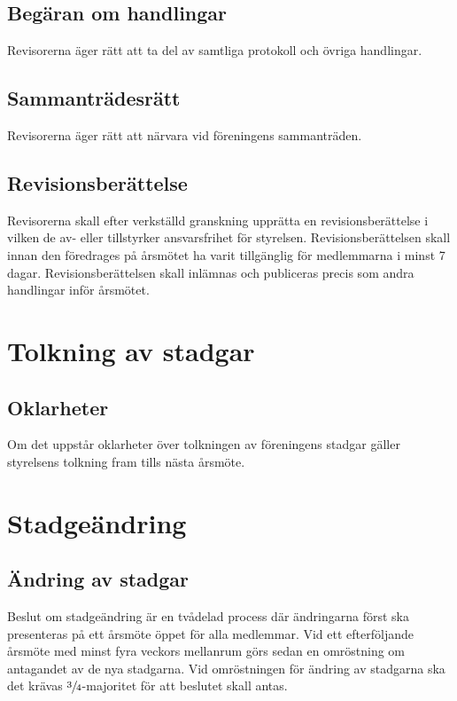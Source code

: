 \documentclass[11pt,a4paper]{article}
\begin{document}
\subsection{Begäran om handlingar}
Revisorerna äger rätt att ta del av samtliga protokoll och övriga handlingar.
\subsection{Sammanträdesrätt}
Revisorerna äger rätt att närvara vid föreningens sammanträden.
\subsection{Revisionsberättelse}
Revisorerna skall efter verkställd granskning upprätta en revisionsberättelse i vilken de av- eller tillstyrker ansvarsfrihet för styrelsen. Revisionsberättelsen skall innan den föredrages på årsmötet ha varit tillgänglig för medlemmarna i minst 7 dagar. Revisionsberättelsen skall inlämnas och publiceras precis som andra handlingar inför årsmötet.



\section{Tolkning av stadgar}

\subsection{Oklarheter}
Om det uppstår oklarheter över tolkningen av föreningens stadgar gäller styrelsens tolkning fram tills nästa årsmöte.



\section{Stadgeändring}

\subsection{Ändring av stadgar}
Beslut om stadgeändring är en tvådelad process där ändringarna först ska
presenteras på ett årsmöte öppet för alla medlemmar. Vid ett efterföljande
årsmöte med minst fyra veckors mellanrum görs sedan en omröstning om
antagandet av de nya stadgarna. Vid omröstningen för ändring av stadgarna 
ska det krävas \(\sfrac{3}{4}\)-majoritet för att beslutet skall antas.
\end{document}
